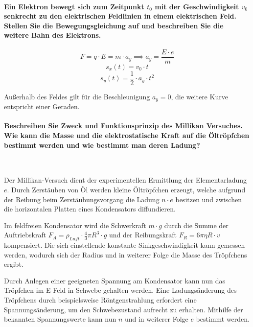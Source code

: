\documentclass[a4paper, 11pt, parskip=half]{scrartcl}
\begin{document}
\paragraph{Ein Elektron bewegt sich zum Zeitpunkt $t_0$ mit der Geschwindigkeit $v_0$ senkrecht zu
den elektrischen Feldlinien in einem elektrischen Feld. Stellen Sie die Bewegungsgleichung auf und
beschreiben Sie die weitere Bahn des Elektrons.}

\begin{equation}
    F = q \cdot E = m \cdot a_y
    \implies
    a_y = \frac{E \cdot e}{m}
\end{equation}
\begin{equation}
    s_x(t) = v_0 \cdot t
\end{equation}
\begin{equation}
    s_y(t) = \frac{1}{2} \cdot a_y \cdot t^2
\end{equation}

Außerhalb des Feldes gilt für die Beschleunigung $a_y = 0$, die weitere Kurve entspricht einer
Geraden.

\paragraph{Beschreiben Sie Zweck und Funktionsprinzip des Millikan Versuches. Wie kann die Masse und
die elektrostatische Kraft auf die Öltröpfchen bestimmt werden und wie bestimmt man deren Ladung?} ~

Der Millikan-Versuch dient der experimentellen Ermittlung der Elementarladung $e$. Durch Zerstäuben
von Öl werden kleine Öltröpfchen erzeugt, welche aufgrund der Reibung beim Zerstäubungsvorgang die
Ladung $n \cdot e$ besitzen und zwischen die horizontalen Platten eines Kondensators diffundieren.

Im feldfreien Kondensator wird die Schwerkraft $m \cdot g$ durch die Summe der Auftriebskraft
$F_A = \rho_{Luft} \cdot \frac{4}{3} \pi R^3 \cdot g$ und der Reibungskraft
$F_R = 6 \pi \eta R \cdot v$ kompensiert. Die sich einstellende konstante Sinkgeschwindigkeit kann
gemessen werden, wodurch sich der Radius und in weiterer Folge die Masse des Tröpfchens ergibt.

Durch Anlegen einer geeigneten Spannung am Kondensator kann nun das Tröpfchen im E-Feld in Schwebe
gehalten werden. Eine Ladungsänderung des Tröpfchens durch beispielsweise Röntgenstrahlung erfordert
eine Spannungsänderung, um den Schwebezustand aufrecht zu erhalten. Mithilfe der bekannten
Spannungswerte kann nun $n$ und in weiterer Folge $e$ bestimmt werden.
\end{document}
